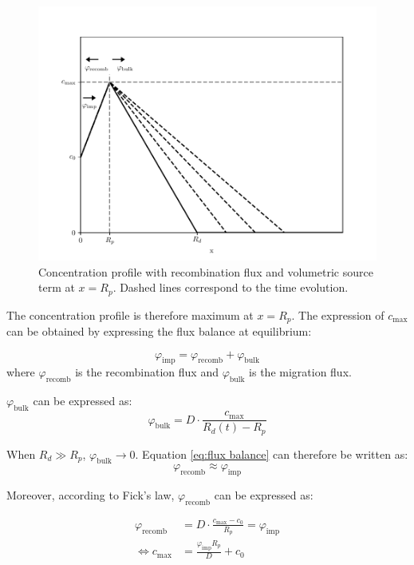 \begin{figure}[h!]
    \centering
    \includegraphics[width=0.75\linewidth]{Figures/Chapter2/recomb_sketch.pdf}
    \caption{Concentration profile with recombination flux and volumetric source term at $x=R_p$. Dashed lines correspond to the time evolution.}
    \label{fig:recomb sketch}
\end{figure}

The concentration profile is therefore maximum at $x=R_p$.
The expression of $c_\mathrm{max}$ can be obtained by expressing the flux balance at equilibrium:

\begin{equation}
    \varphi_\mathrm{imp} = \varphi_\mathrm{recomb} + \varphi_\mathrm{bulk}
    \label{eq:flux balance}
\end{equation}
where $\varphi_\mathrm{recomb}$ is the recombination flux and $\varphi_\mathrm{bulk}$ is the migration flux.

$\varphi_\mathrm{bulk}$ can be expressed as:
\begin{equation}
    \varphi_\mathrm{bulk} = D \cdot \frac{c_\mathrm{max}}{R_d(t) - R_p}
\end{equation}

When $R_d \gg R_p$, $\varphi_\mathrm{bulk} \rightarrow 0$.
Equation \ref{eq:flux balance} can therefore be written as:
\begin{equation}
    \varphi_\mathrm{recomb} \approx \varphi_\mathrm{imp}
    \label{eq:flux balance 2}
\end{equation}

Moreover, according to Fick's law, $\varphi_\mathrm{recomb}$ can be expressed as:

\begin{eqnarray}
    \varphi_\mathrm{recomb} &= D \cdot \frac{c_\mathrm{max}-c_{0}}{R_{p}} = \varphi_\mathrm{imp}\\
    \Leftrightarrow c_\mathrm{max} &= \frac{\varphi_\mathrm{imp} R_{p}}{D}+ c_0
    \label{eq:c_max}
\end{eqnarray}

